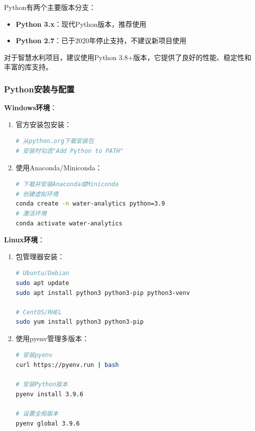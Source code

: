 Python有两个主要版本分支：

\begin{itemize}
\tightlist
\item
  \textbf{Python 3.x}：现代Python版本，推荐使用
\item
  \textbf{Python 2.7}：已于2020年停止支持，不建议新项目使用
\end{itemize}

对于智慧水利项目，建议使用Python
3.8+版本，它提供了良好的性能、稳定性和丰富的库支持。

\subsubsection{Python安装与配置}\label{pythonux5b89ux88c5ux4e0eux914dux7f6e}

\textbf{Windows环境}：

\begin{enumerate}
\def\labelenumi{\arabic{enumi}.}
\item
  官方安装包安装：

\begin{lstlisting}[language=bash]
# 从python.org下载安装包
# 安装时勾选"Add Python to PATH"
\end{lstlisting}
\item
  使用Anaconda/Miniconda：

\begin{lstlisting}[language=bash]
# 下载并安装Anaconda或Miniconda
# 创建虚拟环境
conda create -n water-analytics python=3.9
# 激活环境
conda activate water-analytics
\end{lstlisting}
\end{enumerate}

\textbf{Linux环境}：

\begin{enumerate}
\def\labelenumi{\arabic{enumi}.}
\item
  包管理器安装：

\begin{lstlisting}[language=bash]
# Ubuntu/Debian
sudo apt update
sudo apt install python3 python3-pip python3-venv

# CentOS/RHEL
sudo yum install python3 python3-pip
\end{lstlisting}
\item
  使用pyenv管理多版本：

\begin{lstlisting}[language=bash]
# 安装pyenv
curl https://pyenv.run | bash

# 安装Python版本
pyenv install 3.9.6

# 设置全局版本
pyenv global 3.9.6
\end{lstlisting}
\end{enumerate}

